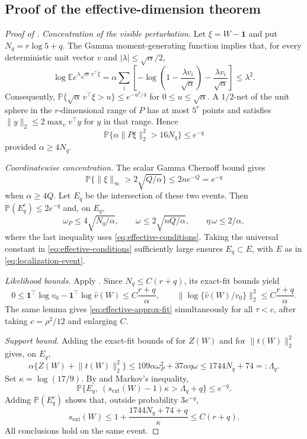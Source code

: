 \documentclass[11pt]{article}
\theoremstyle{definition}
\theoremstyle{remark}
\newcommand{\EE}{\mathbb E}
\newcommand{\PP}{\mathbb P}
\newcommand{\one}{\bm 1}
\newcommand{\norm}[1]{\lVert #1\rVert}
\newcommand{\abs}[1]{\lvert #1\rvert}
\newcommand{\vhat}{\widehat v}
\newcommand{\sext}{s_{\mathrm{ext}}}
\begin{document}
\subsection{Proof of the effective-dimension theorem}
\label{app:effective-proof}

\begin{proof}[Proof of ]
\emph{Concentration of the visible perturbation.}  Let $\xi=W-\one$ and put
$N_q=r\log5+q$.  The Gamma moment-generating function implies that, for
every deterministic unit vector $v$ and $\abs{\lambda}\le\sqrt\alpha/2$,
\[
 \log\EE e^{\lambda\sqrt\alpha\,v^\top\xi}
 =\alpha\sum_i\left[-\log\left(1-\frac{\lambda v_i}{\sqrt\alpha}\right)
 -\frac{\lambda v_i}{\sqrt\alpha}\right]\le\lambda^2.
\]
Consequently, $\PP\{\sqrt\alpha\,v^\top\xi>u\}\le e^{-u^2/4}$ for
$0\le u\le\sqrt\alpha$.  A $1/2$-net of the unit sphere in the
$r$-dimensional range of $P$ has at most $5^r$ points and satisfies
$\norm{y}_2\le2\max_v v^\top y$ for $y$ in that range.  Hence
\begin{equation}\label{eq:proj-concentration}
 \PP\{\alpha\norm{P\xi}_2^2>16N_q\}\le e^{-q}
\end{equation}
provided $\alpha\ge4N_q$.

\emph{Coordinatewise concentration.}  The scalar Gamma Chernoff bound gives
\[
 \PP\{\norm{\xi}_\infty>2\sqrt{Q/\alpha}\}
 \le2n e^{-Q}=e^{-q}
\]
when $\alpha\ge4Q$.  Let $E_q$ be the intersection of these two events.
Then $\PP(E_q^c)\le2e^{-q}$ and, on $E_q$,
\[
 \omega_P\le4\sqrt{N_q/\alpha},\qquad
 \omega\le2\sqrt{nQ/\alpha},\qquad
 \eta\,\omega\le2/\alpha,
\]
where the last inequality uses \eqref{eq:effective-conditions}.  Taking the
universal constant in \eqref{eq:effective-conditions} sufficiently large
ensures $E_q\subset E$, with $E$ as in \eqref{eq:localization-event}.

\emph{Likelihood bounds.}  Apply .  Since
$N_q\le C(r+q)$, its exact-fit bounds yield
\[
 0\le\one^\top\log v_0-\one^\top\log\vhat(W)
 \le C\frac{r+q}{\alpha},
 \qquad
 \norm{\log\{\vhat(W)/v_0\}}_2^2
 \le C\frac{r+q}{\alpha}.
\]
The same lemma gives \eqref{eq:effective-approx-fit} simultaneously for all
$\tau<c$, after taking $c=\rho^2/12$ and enlarging $C$.

\emph{Support bound.}  Adding the exact-fit bounds of  for
$Z(W)$ and for $\norm{t(W)}_2^2$ gives, on $E_q$,
\[
 \alpha\{Z(W)+\norm{t(W)}_2^2\}
 \le109\alpha\omega_P^2+37\alpha\eta\omega
 \le1744N_q+74=:\Lambda_q.
\]
Set $\kappa=\log(17/9)$.  By  and Markov's
inequality,
\[
 \PP\{E_q,\ (\sext(W)-1)\kappa>\Lambda_q+q\}\le e^{-q}.
\]
Adding $\PP(E_q^c)$ shows that, outside probability $3e^{-q}$,
\[
 \sext(W)
 \le1+\frac{1744N_q+74+q}{\kappa}
 \le C(r+q).
\]
All conclusions hold on the same event.
\end{proof}
\end{document}
